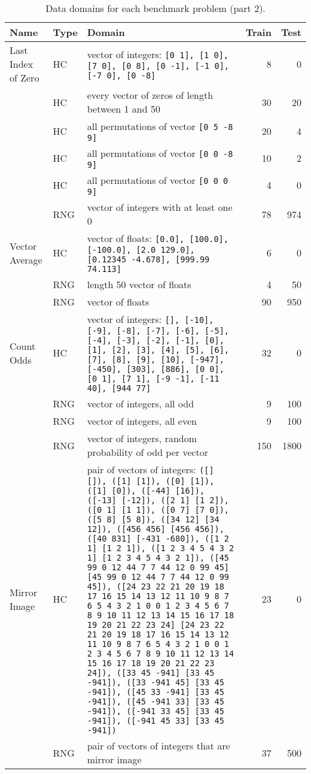 \documentclass{sig-alternate}
\begin{document}
\begin{table*}
\centering
\caption{Data domains for each benchmark problem (part 2).}
\label{datadomains2}
\begin{tabular}{>{\raggedright}p{3.5cm} l >{\raggedright}p{9.8cm} rr}
\toprule
\textbf{Name} & \textbf{Type} & \textbf{Domain} & \textbf{Train} & \textbf{Test} \\
\midrule
Last Index of Zero & HC & vector of integers: \texttt{[0 1], [1 0], [7 0], [0 8], [0 -1], [-1 0], [-7 0], [0 -8]} & 8 & 0 \tabularnewline
 & HC & every vector of zeros of length between 1 and 50 & 30 & 20 \tabularnewline
 & HC & all permutations of vector \texttt{[0 5 -8 9]} & 20 & 4 \tabularnewline
 & HC & all permutations of vector \texttt{[0 0 -8 9]} & 10 & 2 \tabularnewline
 & HC & all permutations of vector \texttt{[0 0 0 9]} & 4 & 0 \tabularnewline
 & RNG & vector of integers with at least one 0 & 78 & 974 \tabularnewline
Vector Average & HC & vector of floats: \texttt{[0.0], [100.0], [-100.0], [2.0 129.0], [0.12345 -4.678], [999.99 74.113]} & 6 & 0 \tabularnewline
 & RNG & length 50 vector of floats & 4 & 50 \tabularnewline
 & RNG & vector of floats & 90 & 950 \tabularnewline
Count Odds & HC & vector of integers: \texttt{[], [-10], [-9], [-8], [-7], [-6], [-5], [-4], [-3], [-2], [-1], [0], [1], [2], [3], [4], [5], [6], [7], [8], [9], [10], [-947], [-450], [303], [886], [0 0], [0 1], [7 1], [-9 -1], [-11 40], [944 77]} & 32 & 0 \tabularnewline
 & RNG & vector of integers, all odd & 9 & 100 \tabularnewline
 & RNG & vector of integers, all even & 9 & 100 \tabularnewline
 & RNG & vector of integers, random probability of odd per vector & 150 & 1800 \tabularnewline
Mirror Image & HC & pair of vectors of integers: \texttt{([] []), ([1] [1]), ([0] [1]), ([1] [0]), ([-44] [16]), ([-13] [-12]), ([2 1] [1 2]), ([0 1] [1 1]), ([0 7] [7 0]), ([5 8] [5 8]), ([34 12] [34 12]), ([456 456] [456 456]), ([40 831] [-431 -680]), ([1 2 1] [1 2 1]), ([1 2 3 4 5 4 3 2 1] [1 2 3 4 5 4 3 2 1]), ([45 99 0 12 44 7 7 44 12 0 99 45] [45 99 0 12 44 7 7 44 12 0 99 45]), ([24 23 22 21 20 19 18 17 16 15 14 13 12 11 10 9 8 7 6 5 4 3 2 1 0 0 1 2 3 4 5 6 7 8 9 10 11 12 13 14 15 16 17 18 19 20 21 22 23 24] [24 23 22 21 20 19 18 17 16 15 14 13 12 11 10 9 8 7 6 5 4 3 2 1 0 0 1 2 3 4 5 6 7 8 9 10 11 12 13 14 15 16 17 18 19 20 21 22 23 24]), ([33 45 -941] [33 45 -941]), ([33 -941 45] [33 45 -941]), ([45 33 -941] [33 45 -941]), ([45 -941 33] [33 45 -941]), ([-941 33 45] [33 45 -941]), ([-941 45 33] [33 45 -941])}  & 23 & 0 \tabularnewline
 & RNG & pair of vectors of integers that are mirror image & 37 & 500 \tabularnewline

\end{tabular}
\end{table*}
\end{document}
